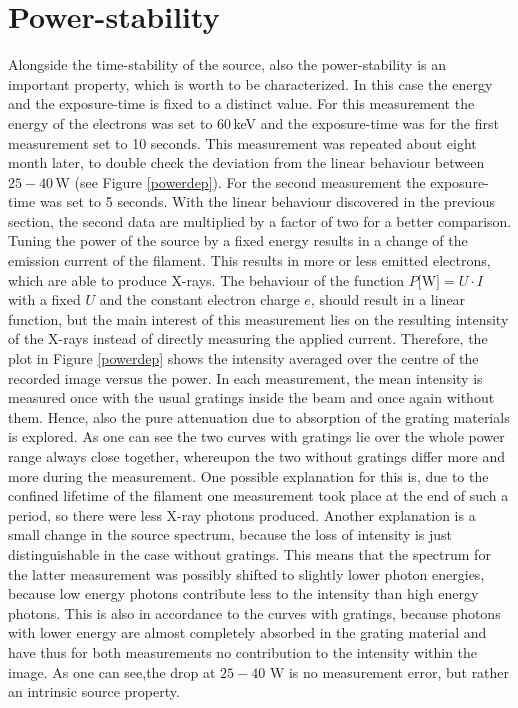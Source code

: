 \section{Power-stability}\label{sec:power}
Alongside the time-stability of the source, also the power-stability is an important property, which is worth to be characterized. In this case the energy and the exposure-time is fixed to a distinct value. For this measurement the energy of the electrons was set to $60\,$keV and the exposure-time was for the first measurement set to 10 seconds. This measurement was repeated about eight month later, to double check the deviation from the linear behaviour between $25-40\,$W (see Figure \ref{powerdep}). For the second measurement the exposure-time was set to 5 seconds. With the linear behaviour discovered in the previous section, the second data are multiplied by a factor of two for a better comparison. Tuning the power of the source by a fixed energy results in a change of the emission current of the filament. This results in more or less emitted electrons, which are able to produce X-rays. The behaviour of the function  $P \text{[W]} =U \cdot I$  with a fixed $U$ and the constant electron charge $e$, should result in a linear function, but the main interest of this measurement lies on the resulting intensity of the X-rays instead of directly measuring the applied current. Therefore, the plot in Figure \ref{powerdep} shows the intensity averaged over the centre of the recorded image versus the power. In each measurement, the mean intensity is measured once with the usual gratings inside the beam and once again without them. Hence, also the pure attenuation due to absorption of the grating materials is explored. As one can see the two curves with gratings lie over the whole power range always close together, whereupon the two without gratings differ more and more during the measurement. One possible explanation for this is, due to the confined lifetime of the filament one measurement took place at the end of such a period, so there were less X-ray photons produced. Another explanation is a small change in the source spectrum, because the loss of intensity is just distinguishable in the case without gratings. This means that the spectrum for the latter measurement was possibly shifted to slightly lower photon energies, because low energy photons contribute less to the intensity than high energy photons. This is also in accordance to the curves with gratings, because photons with lower energy are almost completely absorbed in the grating material and have thus for both measurements no contribution to the intensity within the image. As one can see,the drop at $25-40$ W is no measurement error, but rather an intrinsic source property. 
